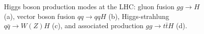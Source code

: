 \begin{figure}[htbp] 
  {\centering
    \caption[Higgs boson production modes at the LHC]{Higgs boson production modes at the LHC:
      gluon fusion $gg\to{}H$ (a), vector boson fusion $qq\to{}qqH$ (b),
      Higgs-strahlung $q\bar{q}\to{}W(Z)H$ (c), and associated
      production $gg\to{}t\bar{t}H$ (d).}
    \label{fig:higgs_production}}
\end{figure}

